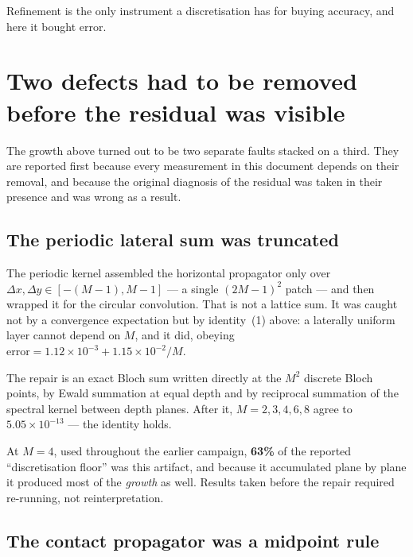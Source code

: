 \documentclass[11pt,a4paper]{article}
\begin{document}
Refinement is the only instrument a discretisation has for buying accuracy, and
here it bought error.

\section{Two defects had to be removed before the residual was visible}

The growth above turned out to be two separate faults stacked on a third. They
are reported first because every measurement in this document depends on their
removal, and because the original diagnosis of the residual was taken in their
presence and was wrong as a result.

\subsection{The periodic lateral sum was truncated}

The periodic kernel assembled the horizontal propagator only over
$\Delta x,\Delta y\in[-(M{-}1),M{-}1]$ --- a single $(2M-1)^2$ patch --- and then
wrapped it for the circular convolution. That is not a lattice sum. It was caught
not by a convergence expectation but by identity~(1) above: a laterally uniform
layer cannot depend on $M$, and it did, obeying
$\text{error}=1.12\times10^{-3}+1.15\times10^{-2}/M$.

The repair is an exact Bloch sum written directly at the $M^2$ discrete Bloch
points, by Ewald summation at equal depth and by reciprocal summation of the
spectral kernel between depth planes. After it, $M=2,3,4,6,8$ agree to
$5.05\times10^{-13}$ --- the identity holds.

\begin{tcolorbox}[colback=yellow!6,colframe=yellow!45!black,title=Consequence for earlier results]
At $M=4$, used throughout the earlier campaign, \textbf{63\%} of the reported
``discretisation floor'' was this artifact, and because it accumulated plane by
plane it produced most of the \emph{growth} as well. Results taken before the
repair required re-running, not reinterpretation.
\end{tcolorbox}

\subsection{The contact propagator was a midpoint rule}
\end{document}
